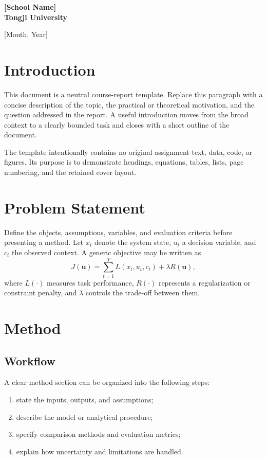 \documentclass[11pt,a4paper]{article}
\newcommand{\SchoolName}{[School Name]}
\newcommand{\InstitutionName}{Tongji University}
\newcommand{\ReportDate}{[Month, Year]}
\begin{document}
\begin{titlepage}
    \vfill

    \begin{center}
        {\LARGE\bfseries \SchoolName \\ \InstitutionName\par}
        \vspace{0.8cm}
        {\Large \ReportDate\par}
    \end{center}

    \restoregeometry
\end{titlepage}

\tableofcontents
\newpage
{}

\section{Introduction}
This document is a neutral course-report template. Replace this paragraph with a concise description of the topic, the practical or theoretical motivation, and the question addressed in the report. A useful introduction moves from the broad context to a clearly bounded task and closes with a short outline of the document.

The template intentionally contains no original assignment text, data, code, or figures. Its purpose is to demonstrate headings, equations, tables, lists, page numbering, and the retained cover layout.

\section{Problem Statement}
Define the objects, assumptions, variables, and evaluation criteria before presenting a method. Let $x_t$ denote the system state, $u_t$ a decision variable, and $c_t$ the observed context. A generic objective may be written as
\begin{equation}
  J(\boldsymbol{u})=
  \sum_{t=1}^{T} L(x_t,u_t,c_t)+\lambda R(\boldsymbol{u}),
\end{equation}
where $L(\cdot)$ measures task performance, $R(\cdot)$ represents a regularization or constraint penalty, and $\lambda$ controls the trade-off between them.

\section{Method}
\subsection{Workflow}
A clear method section can be organized into the following steps:
\begin{enumerate}
  \item state the inputs, outputs, and assumptions;
  \item describe the model or analytical procedure;
  \item specify comparison methods and evaluation metrics;
  \item explain how uncertainty and limitations are handled.
\end{enumerate}
\end{document}
